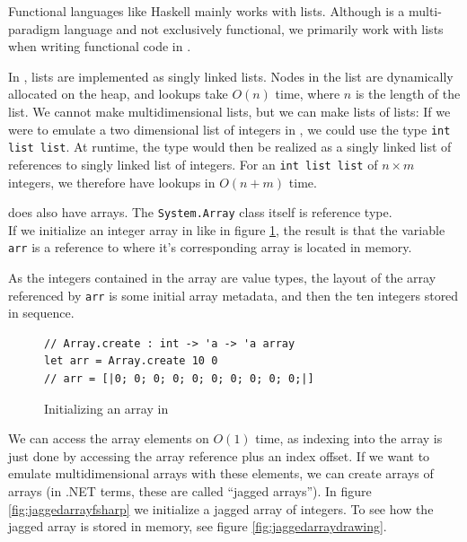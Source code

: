 Functional languages like Haskell mainly works with lists. Although \fsharp{} is
a multi-paradigm language and not exclusively functional, we primarily work with
lists when writing functional code in \fsharp{}.

In \fsharp{}, lists are implemented as singly linked lists. Nodes in the
list are dynamically allocated on the heap, and lookups take $O(n)$ time, where
$n$ is the length of the list.
We cannot make multidimensional lists, but we can make lists of lists: If we
were to emulate a two dimensional list of integers in \fsharp{}, we could use
the type \texttt{int list list}. At runtime, the type would then be realized as
a singly linked list of references to singly linked list of integers.
For an \texttt{int list list} of $n \times m$ integers, we therefore have
lookups in $O(n+m)$ time.

\fsharp{} does also have arrays. The \texttt{System.Array} class itself is reference
type.\\
If we initialize an integer array in \fsharp{} like in figure
\ref{fig:initarray0}, the result is that the variable \texttt{arr} is a reference to where it's corresponding
array is located in memory. 

As the integers contained in the array are value
types, the layout of the array referenced by \texttt{arr} is some initial array
metadata, and then the ten integers stored in sequence.
\begin{figure}[H]
  \centering
\begin{verbatim}
// Array.create : int -> 'a -> 'a array
let arr = Array.create 10 0
// arr = [|0; 0; 0; 0; 0; 0; 0; 0; 0; 0;|]
\end{verbatim}
  \caption{Initializing an array in \fsharp{}}
  \label{fig:initarray0}
\end{figure}
We can access the array elements on $O(1)$ time, as indexing into the array is
just done by accessing the array reference plus an index offset.
If we want to emulate multidimensional arrays with these elements, we can create
arrays of arrays (in .NET terms, these are called ``jagged arrays'').
In figure \ref{fig:jaggedarrayfsharp} we initialize a jagged array of integers.
To see how the jagged array is stored in memory, see figure \ref{fig:jaggedarraydrawing}.

